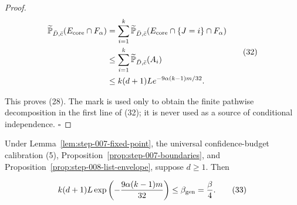 \begin{proof}
\[
\begin{aligned}
 \widetilde{\mathbb P}_{\bar D,\bar c}
   (E_{\rm core}\cap F_\alpha)
 &=\sum_{i=1}^k
   \widetilde{\mathbb P}_{\bar D,\bar c}
   (E_{\rm core}\cap\{J=i\}\cap F_\alpha)\\
 &\leq\sum_{i=1}^k
   \widetilde{\mathbb P}_{\bar D,\bar c}(A_i)\\
 &\leq k(d+1)L e^{-9\alpha(k-1)m/32}.
\end{aligned}
 \tag{32}
\]

This proves (28). The mark is used only to obtain the finite pathwise
decomposition in the first line of (32); it is never used as a source of
conditional independence. \(\square\)


\end{proof}

\begin{lemma}\label{lem:step-013-beta-gen}
Under Lemma~\ref{lem:step-007-fixed-point}, the  universal
confidence-budget calibration (5), Proposition~\ref{prop:step-007-boundaries}, and Proposition~\ref{prop:step-008-list-envelope}, suppose \(d\geq1\). Then

\[
 k(d+1)L
 \exp\left(-\frac{9\alpha(k-1)m}{32}\right)
 \leq\beta_{\rm gen}=\frac\beta4.
 \tag{33}
\]


\end{lemma}


